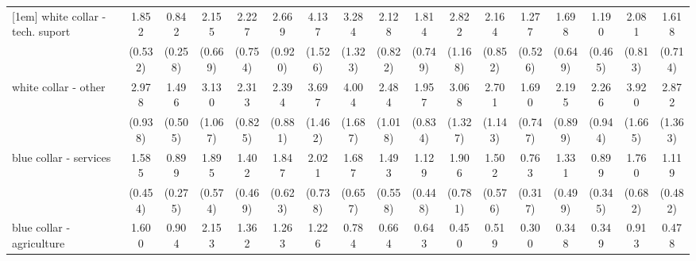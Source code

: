 {\begin{tabular}{l*{16}{c}}
[1em]
white collar - tech. suport&       1.852\sym{*}  &       0.842         &       2.155\sym{*}  &       2.227\sym{*}  &       2.669\sym{**} &       4.137\sym{***}&       3.284\sym{**} &       2.128         &       1.814         &       2.822\sym{*}  &       2.164         &       1.277         &       1.698         &       1.190         &       2.081         &       1.618         \\
                    &     (0.532)         &     (0.258)         &     (0.669)         &     (0.754)         &     (0.920)         &     (1.526)         &     (1.323)         &     (0.822)         &     (0.749)         &     (1.168)         &     (0.852)         &     (0.526)         &     (0.649)         &     (0.465)         &     (0.813)         &     (0.714)         \\
[1em]
white collar - other&       2.978\sym{***}&       1.496         &       3.130\sym{***}&       2.313\sym{*}  &       2.394\sym{*}  &       3.697\sym{***}&       4.004\sym{***}&       2.484\sym{*}  &       1.957         &       3.068\sym{**} &       2.701\sym{*}  &       1.690         &       2.195         &       2.266\sym{*}  &       3.920\sym{**} &       2.872\sym{*}  \\
                    &     (0.938)         &     (0.505)         &     (1.067)         &     (0.825)         &     (0.881)         &     (1.462)         &     (1.687)         &     (1.018)         &     (0.834)         &     (1.327)         &     (1.143)         &     (0.747)         &     (0.899)         &     (0.944)         &     (1.665)         &     (1.363)         \\
[1em]
blue collar - services&       1.585         &       0.899         &       1.895\sym{*}  &       1.402         &       1.847         &       2.021         &       1.687         &       1.493         &       1.129         &       1.906         &       1.502         &       0.763         &       1.331         &       0.899         &       1.760         &       1.119         \\
                    &     (0.454)         &     (0.275)         &     (0.574)         &     (0.469)         &     (0.623)         &     (0.738)         &     (0.657)         &     (0.558)         &     (0.448)         &     (0.781)         &     (0.576)         &     (0.317)         &     (0.499)         &     (0.345)         &     (0.682)         &     (0.482)         \\
[1em]
blue collar - agriculture&       1.600         &       0.904         &       2.153         &       1.362         &       1.263         &       1.226         &       0.784         &       0.664         &       0.643         &       0.450         &       0.519         &       0.300\sym{*}  &       0.348\sym{*}  &       0.349\sym{*}  &       0.913         &       0.478         \\

\end{tabular}}
